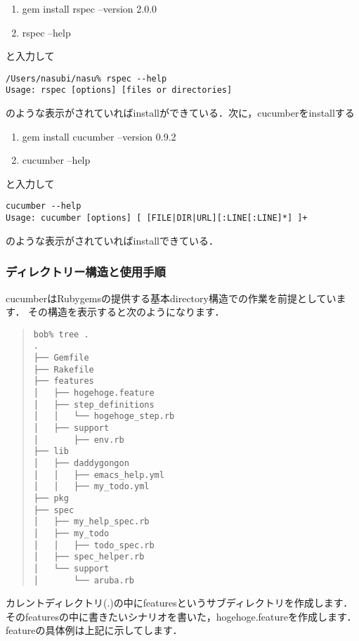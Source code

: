 \begin{enumerate}
\item gem install rspec --version 2.0.0
\item rspec --help
\end{enumerate}
と入力して
\begin{lstlisting}[style=customCsh]
/Users/nasubi/nasu% rspec --help
Usage: rspec [options] [files or directories]
\end{lstlisting}
のような表示がされていればinstallができている．次に，cucumberをinstallする

\begin{enumerate}
\item gem install cucumber --version 0.9.2
\item cucumber --help
\end{enumerate}
と入力して
\begin{lstlisting}[style=customCsh]
cucumber --help
Usage: cucumber [options] [ [FILE|DIR|URL][:LINE[:LINE]*] ]+
\end{lstlisting}
のような表示がされていればinstallできている．

\subsubsection{ディレクトリー構造と使用手順}
cucumberはRubygemsの提供する基本directory構造での作業を前提としています．
その構造を表示すると次のようになります．
\begin{quote}\begin{verbatim}
bob% tree .
.
├── Gemfile
├── Rakefile
├── features
│   ├── hogehoge.feature
│   ├── step_definitions
│   │   └── hogehoge_step.rb
│   ├── support
│       ├── env.rb
├── lib
│   ├── daddygongon
│   │   ├── emacs_help.yml
│   │   ├── my_todo.yml
├── pkg
├── spec
│   ├── my_help_spec.rb
│   ├── my_todo
│   │   ├── todo_spec.rb
│   ├── spec_helper.rb
│   └── support
│       └── aruba.rb
\end{verbatim}\end{quote}
カレントディレクトリ(.)の中にfeaturesというサブディレクトリを作成します．
そのfeaturesの中に書きたいシナリオを書いた，hogehoge.featureを作成します．
featureの具体例は上記に示してします．

